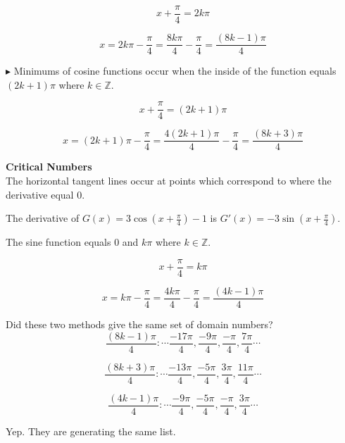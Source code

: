 \documentclass{ximera}
\begin{document}
\begin{example}
\begin{explanation}
\[
x + \frac{\pi}{4} = 2 k \pi
\]

\[
x = 2 k \pi - \frac{\pi}{4} = \frac{8 k \pi}{4} - \frac{\pi}{4} = \frac{(8k - 1)\pi}{4}
\]




$\blacktriangleright$ Minimums of cosine functions occur when the inside of the function equals $(2 k + 1) \pi$ where $k \in \mathbb{Z}$.


\[
x + \frac{\pi}{4} = (2 k + 1) \pi
\]

\[
x = (2 k + 1) \pi - \frac{\pi}{4} = \frac{4(2 k + 1) \pi}{4} - \frac{\pi}{4} = \frac{(8k + 3)\pi}{4}
\]


\end{explanation}








\begin{explanation} \textbf{\textcolor{blue!55!black}{Critical Numbers}} \\


The horizontal tangent lines occur at points which correspond to where the derivative equal $0$.  






The derivative of $G(x) = 3 \cos\left( x + \frac{\pi}{4} \right) - 1$ is $G'(x) = -3 \sin\left( x + \frac{\pi}{4} \right)$.


The sine function equals $0$ and $k \pi$ where $k \in \mathbb{Z}$.



\[
x + \frac{\pi}{4} =  k \pi
\]


\[
x  =    k \pi - \frac{\pi}{4} =  \frac{4 k \pi}{4} - \frac{\pi}{4} = \frac{(4k - 1)\pi}{4}
\]









\end{explanation}



Did these two methods give the same set of domain numbers? \\



\[
\frac{(8k - 1)\pi}{4} :  \cdots \frac{-17\pi}{4}, \frac{-9\pi}{4}, \frac{-\pi}{4}, \frac{7\pi}{4} \cdots
\]

\[
\frac{(8k + 3)\pi}{4} :  \cdots \frac{-13\pi}{4}, \frac{-5\pi}{4}, \frac{3\pi}{4}, \frac{11\pi}{4} \cdots
\]


\[
\frac{(4k - 1)\pi}{4} :  \cdots \frac{-9\pi}{4}, \frac{-5\pi}{4}, \frac{-\pi}{4}, \frac{3\pi}{4} \cdots
\]



Yep.  They are generating the same list.


\end{example}
\end{document}
